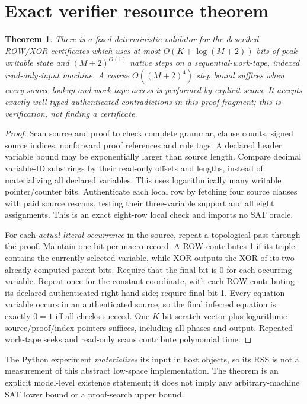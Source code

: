 \documentclass[11pt]{article}
\newtheorem{theorem}{Theorem}
\begin{document}
\section{Exact verifier resource theorem}
\begin{theorem}
There is a fixed deterministic validator for the described ROW/XOR certificates which uses at most $O(K+\log(M+2))$ bits of peak writable state and $(M+2)^{O(1)}$ native steps on a sequential-work-tape, indexed read-only-input machine. A coarse $O((M+2)^4)$ step bound suffices when every source lookup and work-tape access is performed by explicit scans. It accepts exactly well-typed authenticated contradictions in this proof fragment; this is \emph{verification}, not finding a certificate.
\end{theorem}
\begin{proof}
Scan source and proof to check complete grammar, clause counts, signed source indices, nonforward proof references and rule tags. A declared header variable bound may be exponentially larger than source length. Compare decimal variable-ID substrings by their read-only offsets and lengths, instead of materializing all declared variables. This uses logarithmically many writable pointer/counter bits. Authenticate each local row by fetching four source clauses with paid source rescans, testing their three-variable support and all eight assignments. This is an exact eight-row local check and imports no SAT oracle.

For each \emph{actual literal occurrence} in the source, repeat a topological pass through the proof. Maintain one bit per macro record. A ROW contributes 1 if its triple contains the currently selected variable, while XOR outputs the XOR of its two already-computed parent bits. Require that the final bit is 0 for each occurring variable. Repeat once for the constant coordinate, with each ROW contributing its declared authenticated right-hand side; require final bit 1. Every equation variable occurs in an authenticated source, so the final inferred equation is exactly $0=1$ iff all checks succeed. One $K$-bit scratch vector plus logarithmic source/proof/index pointers suffices, including all phases and output. Repeated work-tape seeks and read-only scans contribute polynomial time. \qedhere
\end{proof}
The Python experiment \emph{materializes} its input in host objects, so its RSS is not a measurement of this abstract low-space implementation. The theorem is an explicit model-level existence statement; it does not imply any arbitrary-machine SAT lower bound or a proof-search upper bound.
\end{document}
